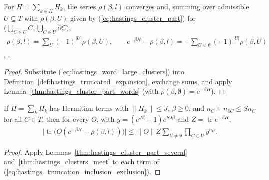 \begin{lemma}
    \label{thm:hastings_truncation_inclusion_exclusion}
    \leanok
    For $H=\sum_{k\in K}H_k$, the series $\rho(\beta,l)$ converges and, summing
    over admissible $U\subseteq T$ with $\rho(\beta,U)$ given by
    (\ref{eq:hastings_cluster_part}) for $\bigl(\bigcup_{C\in U}C,\bigcup_{C\in U}\partial C\bigr)$,
    \begin{align}
        \rho(\beta,l)=\sum_U(-1)^{|U|}\rho(\beta,U),\qquad
        e^{-\beta H}-\rho(\beta,l)=-\sum_{U\neq\emptyset}(-1)^{|U|}\rho(\beta,U)
        \label{eq:hastings_truncation_inclusion_exclusion}
    \end{align}
    \cite[lines 1197--1225]{Hastings2006Solving},
    \cite{gap:hastings05_cluster_boundary}.
\end{lemma}
\begin{proof}
    \leanok
    Substitute (\ref{eq:hastings_word_large_clusters}) into
    Definition~\ref{def:hastings_truncated_expansion}, exchange sums, and apply
    Lemma~\ref{thm:hastings_cluster_part_words} (with $\rho(\beta,\emptyset)=e^{-\beta H}$).
\end{proof}

\begin{lemma}
    \label{thm:hastings_truncation_trace_bound}
    \leanok
    If $H=\sum_kH_k$ has Hermitian terms with $\|H_k\|\le J$, $\beta\ge0$, and
    $n_C+n_{\partial C}\le Sn_C$ for all $C\in T$, then for every $O$, with
    $y=(e^{J\beta}-1)e^{SJ\beta}$ and $Z=\operatorname{tr}e^{-\beta H}$,
    \begin{align}
        \bigl|\operatorname{tr}\bigl(O(e^{-\beta H}-\rho(\beta,l))\bigr)\bigr|
        \le\|O\|Z\sum_{U\neq\emptyset}\prod_{C\in U}y^{n_C}.
        \label{eq:hastings_truncation_trace_bound}
    \end{align}
\end{lemma}
\begin{proof}
    \leanok
    Apply Lemmas~\ref{thm:hastings_cluster_part_several}
    and~\ref{thm:hastings_clusters_meet} to each term of
    (\ref{eq:hastings_truncation_inclusion_exclusion}).
\end{proof}

